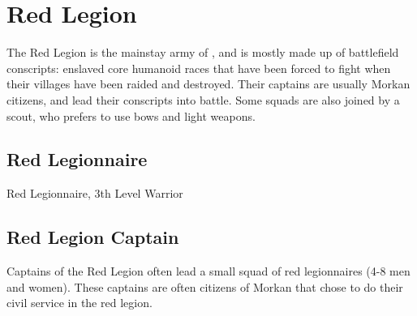 \section{Red Legion}
\label{sec:monster:Red Legion}

The Red Legion is the mainstay army of , and is mostly made
up of battlefield conscripts: enslaved core humanoid races that have been forced
to fight when their villages have been raided and destroyed. Their captains are
usually Morkan citizens, and lead their conscripts into battle. Some squads are
also joined by a scout, who prefers to use bows and light weapons.

\subsection{Red Legionnaire}
\label{sec:monster:Red Legionnaire}

\begin{35e}{\Large{Red Legionnaire, 3th Level Warrior}}
\end{35e}

\subsection{Red Legion Captain}
\label{sec:monster:Red Legion Captain}

Captains of the Red Legion often lead a small squad of red legionnaires (4-8
men and women). These captains are often citizens of Morkan that chose to do
their civil service in the red legion.

